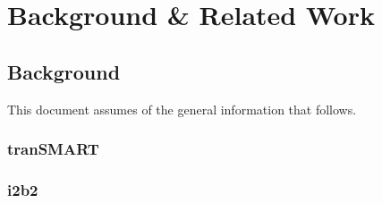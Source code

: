 \chapter{Background \& Related Work}

\section{Background}
This document assumes of the general information that follows.




\subsection{tranSMART}

\subsection{i2b2}
\label{sec:bg-i2b2}







